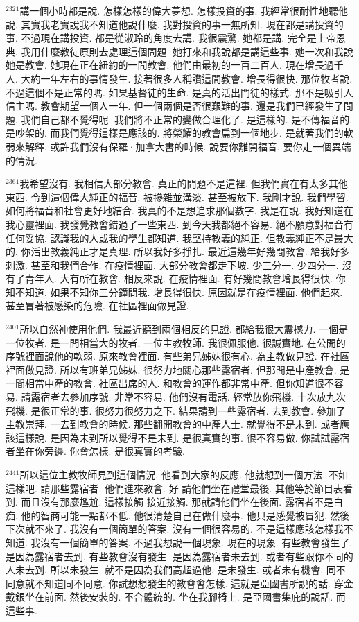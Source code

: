 \documentclass{book}
\begin{document}
$^{2321}$講一個小時都是說.
怎樣怎樣的偉大夢想.
怎樣投資的事.
我經常很耐性地聽他說.
其實我老實說我不知道他說什麼.
我對投資的事一無所知.
現在都是講投資的事.
不過現在講投資.
都是從淑玲的角度去講.
我很震驚.
她都是講.
完全是上帝恩典.
我用什麼教徒原則去處理這個問題.
她打來和我說都是講這些事.
她一次和我說她是教會.
她現在正在紐約的一間教會.
他們由最初的一百二百人.
現在增長過千人.
大約一年左右的事情發生.
接著很多人稱讚這間教會.
增長得很快.
那位牧者說.
不過這個不是正常的嗎.
如果基督徒的生命.
是真的活出門徒的樣式.
那不是吸引人信主嗎.
教會期望一個人一年.
但一個兩個是否很艱難的事.
還是我們已經發生了問題.
我們自己都不覺得呢.
我們將不正常的變做合理化了.
是這樣的.
是不傳福音的.
是吵架的.
而我們覺得這樣是應該的.
將榮耀的教會扁到一個地步.
是就著我們的軟弱來解釋.
或許我們沒有保羅·加拿大書的時候.
說要你離開福音.
要你走一個異端的情況.

$^{2361}$我希望沒有.
我相信大部分教會.
真正的問題不是這裡.
但我們實在有太多其他東西.
令到這個偉大純正的福音.
被摻雜並溝淡.
甚至被放下.
我剛才說.
我們學習.
如何將福音和社會更好地結合.
我真的不是想追求那個數字.
我是在說.
我好知道在我心靈裡面.
我發覺教會錯過了一些東西.
到今天我都絕不容易.
絕不願意對福音有任何妥協.
認識我的人或我的學生都知道.
我堅持教義的純正.
但教義純正不是最大的.
你活出教義純正才是真理.
所以我好多掙扎.
最近這幾年好幾間教會.
給我好多刺激.
甚至和我們合作.
在疫情裡面.
大部分教會都走下坡.
少三分一.
少四分一.
沒有了青年人.
大有所在教會.
相反來說.
在疫情裡面.
有好幾間教會增長得很快.
你知不知道.
如果不知你三分鐘問我.
增長得很快.
原因就是在疫情裡面.
他們起來.
甚至冒著被感染的危險.
在社區裡面做見證.

$^{2401}$所以自然神使用他們.
我最近聽到兩個相反的見證.
都給我很大震撼力.
一個是一位牧者.
是一間相當大的牧者.
一位主教牧師.
我很佩服他.
很誠實地.
在公開的序號裡面說他的軟弱.
原來教會裡面.
有些弟兄姊妹很有心.
為主教做見證.
在社區裡面做見證.
所以有班弟兄姊妹.
很努力地關心那些露宿者.
但那間是中產教會.
是一間相當中產的教會.
社區出席的人.
和教會的運作都非常中產.
但你知道很不容易.
請露宿者去參加序號.
非常不容易.
他們沒有電話.
經常放你飛機.
十次放九次飛機.
是很正常的事.
很努力很努力之下.
結果請到一些露宿者.
去到教會.
參加了主教崇拜.
一去到教會的時候.
那些翻開教會的中產人士.
就覺得不是未到.
或者應該這樣說.
是因為未到所以覺得不是未到.
是很真實的事.
很不容易做.
你試試露宿者坐在你旁邊.
你會怎樣.
是很真實的考驗.

$^{2441}$所以這位主教牧師見到這個情況.
他看到大家的反應.
他就想到一個方法.
不如這樣吧.
請那些露宿者.
他們進來教會.
好 請他們坐在禮堂最後.
其他等於節目表看到.
而且沒有那麼尷尬.
這樣接觸 接近接觸.
那就請他們坐在後面.
露宿者不是白痴.
他的智商可能一點都不低.
他很清楚自己在做什麼事.
他只是感覺被冒犯.
然後下次就不來了.
我沒有一個簡單的答案.
沒有一個很容易的.
不是這樣應該怎樣我不知道.
我沒有一個簡單的答案.
不過我想說一個現象.
現在的現象.
有些教會發生了.
是因為露宿者去到.
有些教會沒有發生.
是因為露宿者未去到.
或者有些跟你不同的人未去到.
所以未發生.
就不是因為我們高超過他.
是未發生.
或者未有機會.
同不同意就不知道同不同意.
你試想想發生的教會會怎樣.
這就是亞國書所說的話.
穿金戴銀坐在前面.
然後安裝的.
不合體統的.
坐在我腳椅上.
是亞國書集庇的說話.
而這些事.
\end{document}
